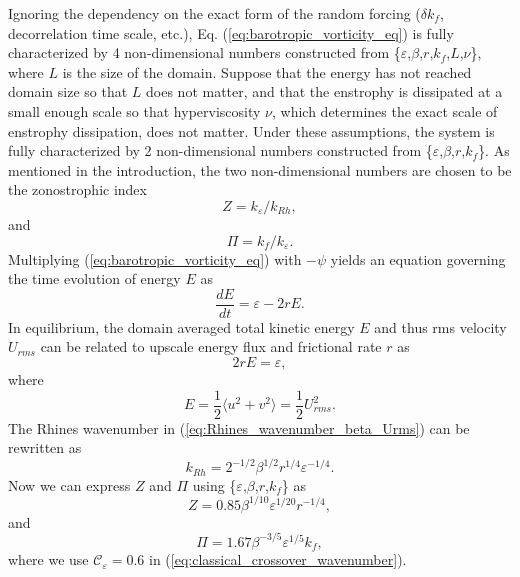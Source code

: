 \documentclass{ametsoc}
\begin{document}
Ignoring the dependency on the exact form of the random forcing 
($\delta k_f$, decorrelation time scale, etc.), Eq.
(\ref{eq:barotropic_vorticity_eq}) is fully characterized by 4 non-dimensional
numbers constructed from \{$\varepsilon$,$\beta$,$r$,$k_{f}$,$L$,$\nu$\},
where $L$ is the size of the domain. Suppose that the energy has
not reached domain size so that $L$ does not matter, and that the
enstrophy is dissipated at a small enough scale so that hyperviscosity
$\nu$, which determines the exact scale of enstrophy dissipation,
does not matter. Under these assumptions, the system is fully characterized
by 2 non-dimensional numbers constructed from \{$\varepsilon$,$\beta$,$r$,$k_{f}$\}.
As mentioned in the introduction, the two non-dimensional numbers
are chosen to be the zonostrophic index 
\begin{equation}
Z=k_{\varepsilon}/k_{Rh},\label{eq:zono_idx_estimate}
\end{equation}
and
\[
\Pi=k_{f}/k_{\varepsilon}.
\]
Multiplying (\ref{eq:barotropic_vorticity_eq}) with $-\psi$ yields
an equation governing the time evolution of energy $E$ as
\begin{equation}
\frac{dE}{dt}=\varepsilon-2rE.\label{eq:energy_evolution_equation}
\end{equation}
In equilibrium, the domain averaged total kinetic energy $E$ and
thus rms velocity $U_{rms}$ can be related to upscale energy flux
and frictional rate $r$ as
\[
2rE=\varepsilon,
\]
where 
\[
E=\frac{1}{2}\langle u^{2}+v^{2}\rangle=\frac{1}{2}U_{rms}^{2}.
\]
The Rhines wavenumber in (\ref{eq:Rhines_wavenumber_beta_Urms}) can
be rewritten as
\begin{equation}
k_{Rh}=2^{-1/2}\beta^{1/2}r^{1/4}\varepsilon^{-1/4}.\label{eq:Rhines_wavenumber_beta_r_epsilon}
\end{equation}
Now we can express $Z$ and $\Pi$ using \{$\varepsilon$,$\beta$,$r$,$k_{f}$\}
as
\begin{equation}
Z=0.85\beta^{1/10}\varepsilon^{1/20}r^{-1/4},\label{eq:Z_estimate_in_work}
\end{equation}
and
\begin{equation}
\Pi=1.67\beta^{-3/5}\varepsilon^{1/5}k_{f},\label{eq:PI_estimate_in_work}
\end{equation}
where we use $\mathcal{\mathcal{C}_{\varepsilon}}=0.6$ in (\ref{eq:classical_crossover_wavenumber}).
\end{document}
